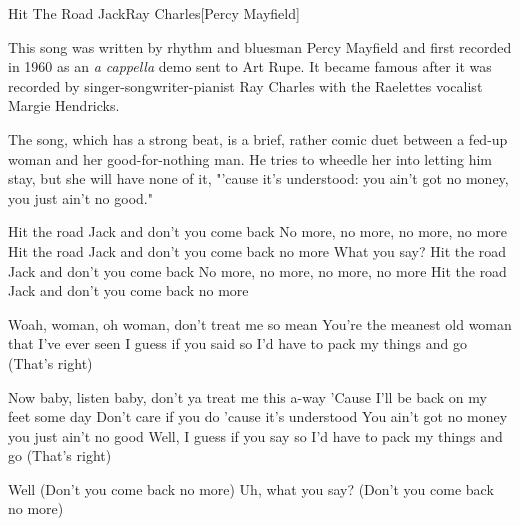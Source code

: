 \documentclass[a4paper,11pt,french]{article}
\begin{document}

\begin{Song}{Hit The Road Jack}{Ray Charles}[Percy Mayfield]

\begin{Paratext}
This song was written by rhythm and bluesman Percy Mayfield and first recorded in 1960 as an \emph{a cappella} demo sent to Art Rupe. It became famous after it was recorded by singer-songwriter-pianist Ray Charles with the Raelettes vocalist Margie Hendricks.

The song, which has a strong beat, is a brief, rather comic duet between a fed-up woman and her good-for-nothing man. He tries to wheedle her into letting him stay, but she will have none of it, "'cause it's understood: you ain't got no money, you just ain't no good."
\end{Paratext}
\espaceParatexteVersMultiColonnes

\begin{multicols}{2}
\begin{Chorus}
Hit the road Jack and don't you come back
No more, no more, no more, no more
Hit the road Jack and don't you come back no more
What you say?
Hit the road Jack and don't you come back
No more, no more, no more, no more
Hit the road Jack and don't you come back no more
\end{Chorus}
\espaceInterStrophe

\begin{Verse}
Woah, woman, oh woman, don't treat me so mean
You're the meanest old woman that I've ever seen
I guess if you said so
I'd have to pack my things and go
(That's right)
\end{Verse}
\espaceInterStrophe

\tochorus
\espaceInterStrophe

\begin{Verse}
Now baby, listen baby, don't ya treat me this a-way
'Cause I'll be back on my feet some day
Don't care if you do 'cause it's understood
You ain't got no money you just ain't no good
Well, I guess if you say so
I'd have to pack my things and go
(That's right)
\end{Verse}
\espaceInterStrophe

\tochorus
\espaceInterStrophe
\columnbreak

\begin{Chorus}
Well
(Don't you come back no more)
Uh, what you say?
(Don't you come back no more)
\espaceInterStrophe


\end{Chorus}
\end{multicols}
\end{Song}
\end{document}
